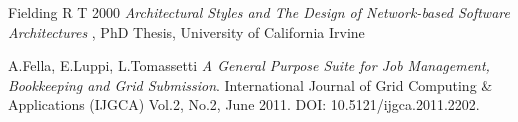 \documentclass[a4paper]{jpconf}
\begin{document}
\begin{thebibliography}{30}


















Fielding R T 2000 {\it Architectural Styles and The Design of Network-based
Software Architectures }, PhD Thesis, University of California Irvine

A.Fella, E.Luppi, L.Tomassetti \emph{A General Purpose Suite for Job Management, Bookkeeping and Grid Submission}. International Journal of Grid Computing \& Applications (IJGCA) Vol.2, No.2, June 2011. DOI: 10.5121/ijgca.2011.2202.

\end{thebibliography}
\end{document}
